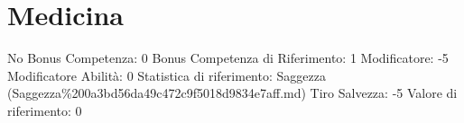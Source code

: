 \section{Medicina}\label{medicina}

\begin{description}
\tightlist
\item[Tags: ABI]
No Bonus Competenza: 0 Bonus Competenza di Riferimento: 1 Modificatore:
-5 Modificatore Abilità: 0 Statistica di riferimento: Saggezza
(Saggezza\%200a3bd56da49c472c9f5018d9834e7aff.md) Tiro Salvezza: -5
Valore di riferimento: 0
\end{description}
